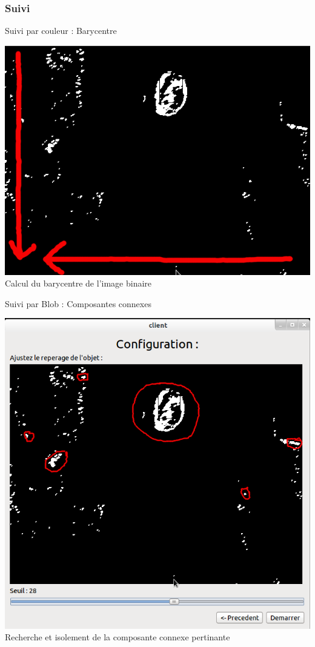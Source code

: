 \documentclass{beamer}
\begin{document}
		\subsubsection{Suivi}
		\begin{frame}{Suivi par couleur : Barycentre}
			\begin{center}
				\includegraphics[scale=0.25]{Capture4.png}\\
				Calcul du barycentre de l'image binaire
			\end{center}
		\end{frame}

		\begin{frame}{Suivi par Blob : Composantes connexes}
			\begin{center}
				\includegraphics[scale=0.25]{Capture5.png}\\
				Recherche et isolement de la composante connexe pertinante
			\end{center}
		\end{frame}
\end{document}

